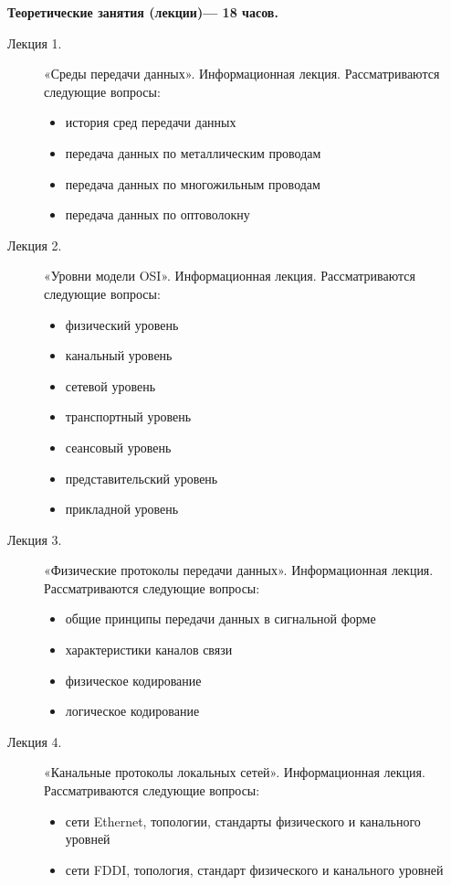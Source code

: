 \begin{center}
{\textbf{Теоретические занятия (лекции)— 18 часов.}
\begin{description}
\item[Лекция 1.] «Среды передачи данных». Информационная лекция. Рассматриваются следующие вопросы: \begin{itemize}
\item история сред передачи данных\item передача данных по металлическим проводам\item передача данных по многожильным проводам\item передача данных по оптоволокну
\end{itemize}\item[Лекция 2.] «Уровни модели OSI». Информационная лекция. Рассматриваются следующие вопросы: \begin{itemize}
\item физический уровень\item канальный уровень\item сетевой уровень\item транспортный уровень\item сеансовый уровень\item представительский уровень\item прикладной уровень
\end{itemize}\item[Лекция 3.] «Физические протоколы передачи данных». Информационная лекция. Рассматриваются следующие вопросы: \begin{itemize}
\item общие принципы передачи данных в сигнальной форме\item характеристики каналов связи\item физическое кодирование\item логическое кодирование
\end{itemize}\item[Лекция 4.] «Канальные протоколы локальных сетей». Информационная лекция. Рассматриваются следующие вопросы: \begin{itemize}
\item сети Ethernet, топологии, стандарты физического и канального уровней\item сети FDDI, топология, стандарт физического и канального уровней
\end{itemize}
\end{description}




}
\end{center}
